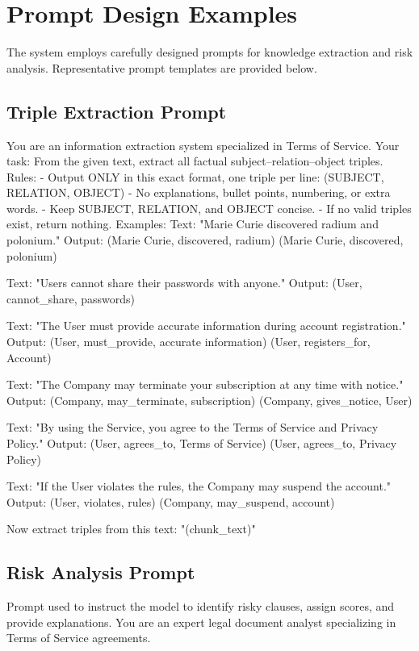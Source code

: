 \section{Prompt Design Examples}
The system employs carefully designed prompts for knowledge
extraction and risk analysis. Representative prompt templates are
provided below.

\subsection{Triple Extraction Prompt}
You are an information extraction system specialized in Terms of Service.
Your task: From the given text, extract all factual subject–relation–object triples.
Rules:
- Output ONLY in this exact format, one triple per line:
  (SUBJECT, RELATION, OBJECT)
- No explanations, bullet points, numbering, or extra words.
- Keep SUBJECT, RELATION, and OBJECT concise.
- If no valid triples exist, return nothing.
Examples:
Text:
"Marie Curie discovered radium and polonium."
Output:
(Marie Curie, discovered, radium)
(Marie Curie, discovered, polonium)

Text:
"Users cannot share their passwords with anyone."
Output:
(User, cannot\_share, passwords)

Text:
"The User must provide accurate information during account registration."
Output:
(User, must\_provide, accurate information)
(User, registers\_for, Account)

Text:
"The Company may terminate your subscription at any time with notice."
Output:
(Company, may\_terminate, subscription)
(Company, gives\_notice, User)

Text:
"By using the Service, you agree to the Terms of Service and Privacy Policy."
Output:
(User, agrees\_to, Terms of Service)
(User, agrees\_to, Privacy Policy)

Text:
"If the User violates the rules, the Company may suspend the account."
Output:
(User, violates, rules)
(Company, may\_suspend, account)

Now extract triples from this text:
"(chunk\_text)"

\subsection{Risk Analysis Prompt}
Prompt used to instruct the model to identify risky clauses, assign scores, and provide explanations.
You are an expert legal document analyst specializing in Terms of Service agreements.


